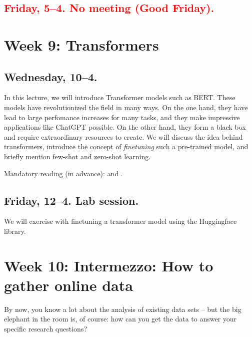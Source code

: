 \subsection*{\textcolor{red}{Friday, 5--4. No meeting (Good Friday).}}




\section*{Week 9: Transformers}

\subsection*{Wednesday, 10--4.}
In this lecture, we will introduce Transformer models such as BERT.  These models have revolutionized the field in many ways. On the one hand, they have lead to large perfomance increases for many tasks, and they make impressive applications like ChatGPT possible. On the other hand, they form a black box and require extraordinary resources to create. We will discuss the idea behind transformers, introduce the concept of \emph{finetuning} such a pre-trained model, and briefly mention few-shot and zero-shot learning.

Mandatory reading (in advance): \cite{Lin2023} and \cite{Bender2021}.




\subsection*{Friday, 12--4. Lab session.}

We will exercise with finetuning a transformer model using the Huggingface library.







\section*{Week 10: Intermezzo: How to gather online data}
By now, you know a lot about the analysis of existing data sets -- but the big elephant in the room is, of course: how can you get the data to answer your specific research questions?

